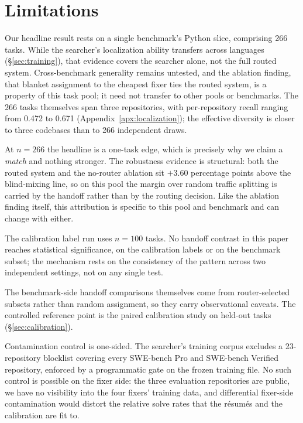 \section{Limitations}
\label{sec:limitations}

Our headline result rests on a single benchmark's Python slice,
comprising 266 tasks.  While the searcher's localization ability
transfers across languages (\S\ref{sec:training}), that evidence covers
the searcher alone, not the full routed system.  Cross-benchmark
generality remains untested, and the ablation finding, that blanket
assignment to the cheapest fixer ties the routed system, is a property
of this task pool; it need not transfer to other pools or benchmarks.
The 266 tasks themselves span three repositories, with per-repository
recall ranging from 0.472 to 0.671
(Appendix~\ref{apx:localization}); the effective diversity is
closer to three codebases than to 266 independent draws.

At $n{=}266$ the headline is a one-task edge, which is precisely why we
claim a \emph{match} and nothing stronger.  The robustness evidence is
structural: both the routed system and the no-router ablation sit
$+3.60$ percentage points above the blind-mixing line, so on this pool
the margin over random traffic splitting is carried by the handoff
rather than by the routing decision.  Like the ablation finding itself,
this attribution is specific to this pool and benchmark and can change
with either.

The calibration label run uses $n{=}100$ tasks.  No handoff contrast in
this paper reaches statistical significance, on the calibration labels
or on the benchmark subset; the mechanism rests on the consistency of
the pattern across two independent settings, not on any single test.

The benchmark-side handoff comparisons themselves come from
router-selected subsets rather than random assignment, so they carry
observational caveats.  The controlled reference point is the paired
calibration study on held-out tasks (\S\ref{sec:calibration}).

Contamination control is one-sided.  The searcher's training corpus
excludes a 23-repository blocklist covering every SWE-bench Pro and
SWE-bench Verified repository, enforced by a programmatic gate on the
frozen training file.  No such control is possible on the fixer side:
the three evaluation repositories are public, we have no visibility
into the four fixers' training data, and differential fixer-side
contamination would distort the relative solve rates that the
r\'esum\'es and the calibration are fit to.

